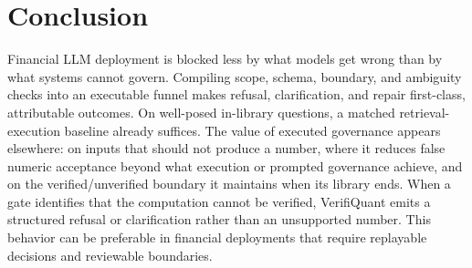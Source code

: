 \documentclass[sigconf,anonymous]{acmart}
\begin{document}
\section{Conclusion}
Financial LLM deployment is blocked less by what models get wrong than by what systems cannot govern.
Compiling scope, schema, boundary, and ambiguity checks into an executable funnel makes refusal, clarification, and repair first-class, attributable outcomes.
On well-posed in-library questions, a matched retrieval-execution baseline already suffices. The value of executed governance appears elsewhere: on inputs that should not produce a number, where it reduces false numeric acceptance beyond what execution or prompted governance achieve, and on the verified/unverified boundary it maintains when its library ends.
When a gate identifies that the computation cannot be verified, VerifiQuant emits a structured refusal or clarification rather than an unsupported number. This behavior can be preferable in financial deployments that require replayable decisions and reviewable boundaries.



\end{document}
